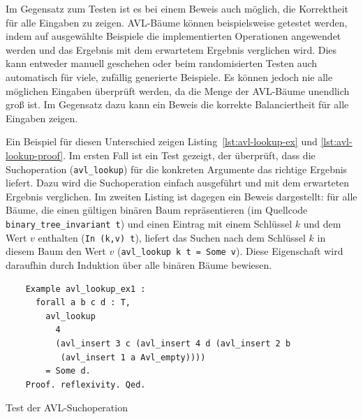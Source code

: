 \documentclass[a4paper, parskip]{scrartcl}
\begin{document}
Im Gegensatz zum Testen ist es bei einem Beweis auch möglich, die Korrektheit für alle Eingaben zu zeigen.
AVL-Bäume können beispielsweise getestet werden, indem auf ausgewählte Beispiele die implementierten Operationen angewendet werden und das Ergebnis mit dem erwartetem Ergebnis verglichen wird.
Dies kann entweder manuell geschehen oder beim randomisierten Testen auch automatisch für viele, zufällig generierte Beispiele.
Es können jedoch nie alle möglichen Eingaben überprüft werden, da die Menge der AVL-Bäume unendlich groß ist.
Im Gegensatz dazu kann ein Beweis die korrekte Balanciertheit für alle Eingaben zeigen.

Ein Beispiel für diesen Unterschied zeigen Listing~\ref{lst:avl-lookup-ex} und \ref{lst:avl-lookup-proof}. 
Im ersten Fall ist ein Test gezeigt, der überprüft, dass die Suchoperation (\verb|avl_lookup|) für die konkreten Argumente das richtige Ergebnis liefert. 
Dazu wird die Suchoperation einfach ausgeführt und mit dem erwarteten Ergebnis verglichen.
Im zweiten Listing ist dagegen ein Beweis dargestellt: für alle Bäume, die einen gültigen binären Baum repräsentieren (im Quellcode \verb|binary_tree_invariant t|) und einen Eintrag mit einem Schlüssel $k$ und dem Wert $v$ enthalten (\verb|In (k,v) t|), liefert das Suchen nach dem Schlüssel $k$ in diesem Baum den Wert $v$ (\verb|avl_lookup k t = Some v|).
Diese Eigenschaft wird daraufhin durch Induktion über alle binären Bäume bewiesen.

\begin{listing}
  \begin{verbatim}
    Example avl_lookup_ex1 :
      forall a b c d : T,
        avl_lookup
          4
          (avl_insert 3 c (avl_insert 4 d (avl_insert 2 b 
           (avl_insert 1 a Avl_empty))))
        = Some d.
    Proof. reflexivity. Qed.
  \end{verbatim}
  \caption{Test der AVL-Suchoperation}
  \label{lst:avl-lookup-ex}
\end{listing}
\end{document}
